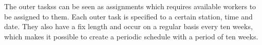 The outer taskss can be seen as assignments which requires available workers to be assigned to them. Each outer task is specified to a certain station, time and date. They also have a fix length and occur on a regular basis every ten weeks, which makes it possible to create a periodic schedule with a period of ten weeks. 






